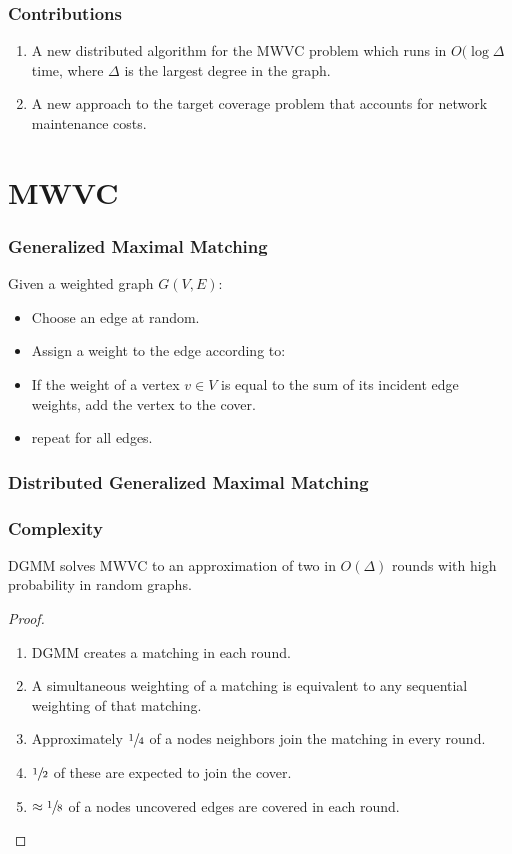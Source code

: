 \begin {frame}
  \frametitle{Contributions}
  \begin{enumerate}
  \item A new distributed algorithm for the MWVC problem which runs in $O(\log \Delta$ time, where $\Delta$ is the largest degree in the graph.
  \item A new approach to the target coverage problem that accounts for network maintenance costs.
  \end{enumerate}
\end{frame}


\section{MWVC}
\begin{frame}[allowframebreaks]
	\frametitle{Generalized Maximal Matching \cite{Gonzalez1995129}}
	Given a weighted graph $G(V,E)$:
	\begin{itemize}
	\item Choose an edge at random.
	\item Assign a weight to the edge according to:\begin{small}
	\end{small}
	\end{itemize}
	\begin{itemize}
	\item If the weight of a vertex $v \in V$ is equal to the sum of its incident edge weights, add the vertex to the cover.
	\item repeat for all edges.
	\end{itemize}
	
\end{frame}

\begin{frame}
  \frametitle{Distributed Generalized Maximal Matching}
  
\end{frame}
\begin{frame}
	\frametitle{Complexity}
	\begin{theorem}
	DGMM solves MWVC to an approximation of two in $O(\Delta)$ rounds with high probability in random graphs.
	\end{theorem}
	\begin{proof}
	\begin{enumerate}
	\item DGMM creates a matching in each round.
	\item A simultaneous weighting of a matching is equivalent to any sequential weighting of that matching.
	\item Approximately $\sfrac{1}{4}$ of a nodes neighbors join the matching in every round.
	\item $\sfrac{1}{2}$ of these are expected to join the cover.
	\item $\approx\sfrac{1}{8}$ of a nodes uncovered edges are covered in each round.
	\end{enumerate}
	\end{proof}
\end{frame}

